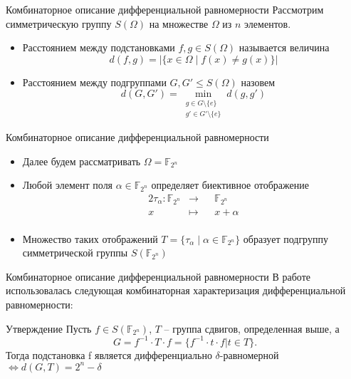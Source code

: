 \documentclass{beamer}
\begin{document}
\begin{frame}{Комбинаторное описание дифференциальной равномерности}
Рассмотрим симметрическую группу $S(\Omega)$ на множестве $\Omega$ из $n$ элементов.
\begin{itemize}
\item Расстоянием между подстановками $f,g \in S(\Omega)$  называется величина $$d(f,g) = |\{ x \in \Omega \; | \; f(x) \neq g(x)\} |$$

\item Расстоянием между подгруппами $G,G' \leq S(\Omega)$ назовем $$d(G,G') = \min_{\substack{g \in G \setminus \{e\}  \\ g' \in G' \setminus \{e\}  }} d(g ,g')$$
\end{itemize}
\end{frame}








\begin{frame}{Комбинаторное описание дифференциальной равномерности}
\begin{itemize}
\item Далее будем рассматривать $\Omega = \mathbb{F}_{2^n}$
\item Любой элемент поля $\alpha \in \mathbb{F}_{2^n}$ определяет биективное отображение 
\begin{alignat*}{2}
\tau_{\alpha} \colon \mathbb{F}_{2^n}&\rightarrow {}&& \mathbb{F}_{2^n} \\
           x&\mapsto     {}&& x + \alpha \\        
\end{alignat*}
\item Множество таких отображений $T = \{ \tau_{ \alpha } \; | \; \alpha \in \mathbb{F}_{2^n} \}$ образует подгруппу симметрической группы $S(\mathbb{F}_{2^n})$
\end{itemize}
\end{frame}




\begin{frame}{Комбинаторное описание дифференциальной равномерности}
В работе использовалась следующая комбинаторная характеризация дифференциальной равномерности:
\begin{block}{Утверждение}
Пусть $f \in S(\mathbb{F}_{2^n})$, $T$ -- группа сдвигов, определенная выше, а $$G = f^{-1} \cdot T \cdot f = \{f^{-1} \cdot t \cdot f | t \in T \}.$$ Тогда подстановка f является дифференциально $\delta$-равномерной $ \iff d(G,T) = 2^n-\delta$
\end{block}

\end{frame}
\end{document}
